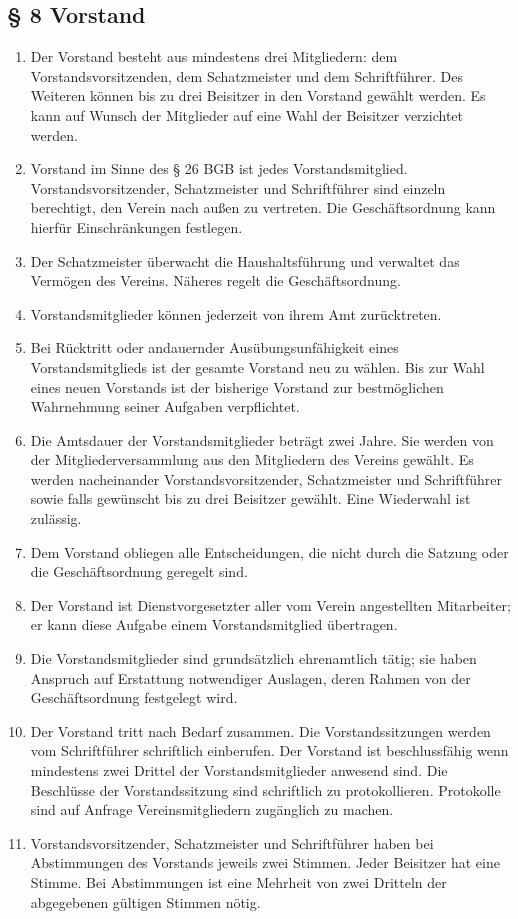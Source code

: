 ﻿\documentclass[10pt,a4paper]{scrartcl}
\begin{document}
\subsection*{§ 8 Vorstand }
\begin{enumerate}

    \item Der Vorstand besteht aus mindestens drei Mitgliedern: dem
    Vorstandsvorsitzenden, dem Schatzmeister und dem Schriftführer. Des
    Weiteren können bis zu drei Beisitzer in den Vorstand gewählt werden. Es
    kann auf Wunsch der Mitglieder auf eine Wahl der Beisitzer verzichtet
    werden.
    \item Vorstand im Sinne des § 26 BGB ist jedes Vorstandsmitglied.
    Vorstandsvorsitzender, Schatzmeister und Schriftführer sind einzeln
    berechtigt, den Verein nach außen zu vertreten. Die Geschäftsordnung kann
    hierfür Einschränkungen festlegen.
        \item Der Schatzmeister über\-wacht die Haushaltsführung und verwaltet das
                Ver\-mö\-gen des Vereins. Nä\-her\-es regelt die Ge\-schäfts\-ord\-nung.
        \item Vorstandsmitglieder können jederzeit von ihrem Amt zurücktreten.
        \item Bei Rücktritt oder andauernder Ausübungsunfähigkeit eines Vorstandsmitglieds ist
                der gesamte Vorstand neu zu wählen. Bis zur Wahl eines neuen Vorstands ist der
                bisherige Vorstand zur bestmöglichen Wahrnehmung seiner Aufgaben verpflichtet.
    \item Die Amtsdauer der Vorstandsmitglieder beträgt zwei Jahre. Sie werden
    von der Mitgliederversammlung aus den Mitgliedern des Vereins gewählt. Es
    werden nacheinander Vorstandsvorsitzender, Schatzmeister und Schriftführer
    sowie falls gewünscht bis zu drei Beisitzer gewählt. Eine Wiederwahl ist
    zulässig.
    \item Dem Vorstand obliegen alle Entscheidungen, die nicht durch die Satzung oder die Geschäftsordnung geregelt sind.
        \item Der Vorstand ist Dienstvorgesetzter aller vom Verein angestellten Mitarbeiter;
                er kann diese Aufgabe einem Vorstandsmitglied übertragen.
        \item Die Vorstandsmitglieder sind grundsätzlich ehrenamtlich tätig; sie haben Anspruch
                auf Erstattung notwendiger Auslagen, deren Rahmen von der Geschäftsordnung
                festgelegt wird.
    \item Der Vorstand tritt nach Bedarf zusammen. Die Vorstandssitzungen
    werden vom Schriftführer schriftlich einberufen. Der Vorstand ist
    beschlussfähig wenn mindestens zwei Drittel der Vorstandsmitglieder
    anwesend sind. Die Beschlüsse der Vorstandssitzung sind schriftlich zu
    protokollieren. Protokolle sind auf Anfrage Vereinsmitgliedern zugänglich zu machen.
    \item Vorstandsvorsitzender, Schatzmeister und Schriftführer haben bei
    Abstimmungen des Vorstands jeweils zwei Stimmen. Jeder Beisitzer hat eine
    Stimme. Bei Abstimmungen ist eine Mehrheit von zwei Dritteln der
    abgegebenen gültigen Stimmen nötig.
\end{enumerate}
\end{document}
